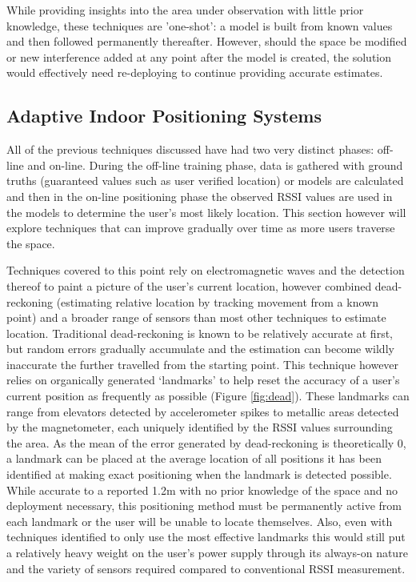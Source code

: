 \documentclass{UoYCSproject}
\begin{document}
                While providing insights into the area under observation with little prior knowledge, these techniques are 'one-shot': a model is built from known values and then followed permanently thereafter. However, should the space be modified or new interference added at any point after the model is created, the solution would effectively need re-deploying to continue providing accurate estimates.
            
            \subsection{Adaptive Indoor Positioning Systems}
            \label{sec:adaptive}
            
                All of the previous techniques discussed have had two very distinct phases: off-line and on-line. During the off-line training phase, data is gathered with ground truths (guaranteed values such as user verified location) or models are calculated and then in the on-line positioning phase the observed RSSI values are used in the models to determine the user's most likely location. This section however will explore techniques that can improve gradually over time as more users traverse the space.
                
                Techniques covered to this point rely on electromagnetic waves and the detection thereof to paint a picture of the user's current location, however \citet{wang2012no} combined dead-reckoning (estimating relative location by tracking movement from a known point) and a broader range of sensors than most other techniques to estimate location. Traditional dead-reckoning is known to be relatively accurate at first, but random errors gradually accumulate and the estimation can become wildly inaccurate the further travelled from the starting point. This technique however relies on organically generated `landmarks' to help reset the accuracy of a user's current position as frequently as possible (Figure \ref{fig:dead}). These landmarks can range from elevators detected by accelerometer spikes to metallic areas detected by the magnetometer, each uniquely identified by the RSSI values surrounding the area. As the mean of the error generated by dead-reckoning is theoretically $0$, a landmark can be placed at the average location of all positions it has been identified at making exact positioning when the landmark is detected possible. While accurate to a reported 1.2m with no prior knowledge of the space and no deployment necessary, this positioning method must be permanently active from each landmark or the user will be unable to locate themselves. Also, even with techniques identified to only use the most effective landmarks this would still put a relatively heavy weight on the user's power supply through its always-on nature and the variety of sensors required compared to conventional RSSI measurement.
                
\end{document}
